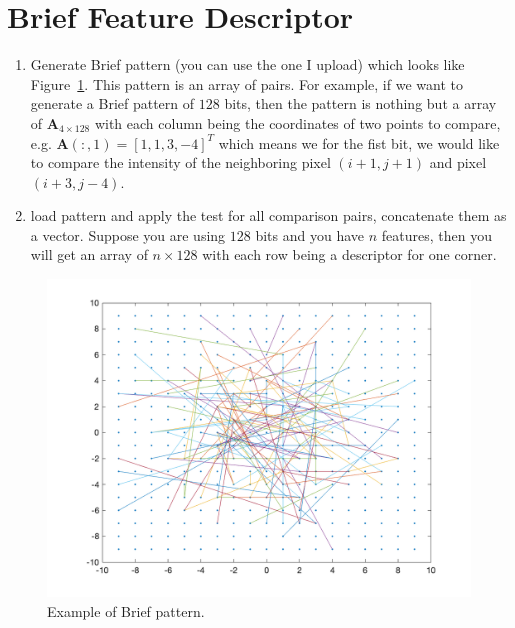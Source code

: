 \documentclass[a4paper]{article}
\begin{document}
\section{Brief Feature Descriptor}
\begin{enumerate}
	\item Generate Brief pattern (you can use the one I upload) which looks like Figure~\ref{fig:bb}. This pattern is an array of pairs. For example, if we want to generate a Brief pattern of $128$ bits, then the pattern is nothing but a array of $\mathbf{A}_{4 \times 128}$ with each column being the coordinates of two points to compare, e.g.  $\mathbf{A}(:, 1)=[1, 1, 3, -4]^T$ which means we for the fist bit, we would like to compare the intensity of the neighboring pixel $(i+1,j+1)$ and pixel $(i+3,j-4)$. 
	\item load pattern and apply the test for all comparison pairs, concatenate them as a vector. Suppose you are using $128$ bits and you have $n$ features, then you will get an array of $n \times 128$ with each row being a descriptor for one corner.
\end{enumerate}
\begin{figure}[!b]
	\centering
	\label{fig:bb}
	\includegraphics[scale=0.3]{figures/brief_pattern.png}
	\caption{Example of Brief pattern.}
\end{figure}
\end{document}
